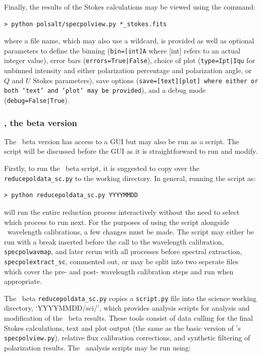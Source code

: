 Finally, the results of the Stokes calculations may be viewed using the command:

\begin{verbatim}> python polsalt/specpolview.py *_stokes.fits\end{verbatim}

\noindent where a file name, which may also use a wildcard, is provided as well as optional para\-meters to define the binning (\texttt{bin=[int]A} where [int] refers to an actual integer value), error bars (\texttt{errors=True|False}), choice of plot (\texttt{type=Ipt|Iqu} for unbinned intensity and either polarization percentage and polarization angle, or $Q$ and $U$ Stokes parameters), save options (\texttt{save=[text][plot] where either or both `text' and `plot' may be provided}), and a debug mode (\texttt{debug=False|True}).


\subsubsection{\polsalt, the beta version}

The \polsalt\ beta version has access to a \gls{GUI} but may also be run as a script. The script will be discussed before the \gls{GUI} as it is straightforward to run and modify.

Firstly, to run the \polsalt\ beta script, it is suggested to copy over the \texttt{reducepol\-data\_sc.py} to the working directory. In general, running the script as:

\begin{verbatim}> python reducepoldata_sc.py YYYYMMDD\end{verbatim}

\noindent will run the entire reduction process interactively without the need to select which process to run next. For the purposes of using the script alongside \iraf\ wavelength calibrations, a few changes must be made. The script may either be run with a break inserted before the call to the wavelength calibration, \texttt{specpolwavmap}, and later rerun with all processes before spectral extraction, \texttt{specpolextract\_sc}, commented out, or may be split into two seperate files which cover the pre- and post- wavelength calibration steps and run when appropriate.

The \polsalt\ beta \texttt{reducepoldata\_sc.py} copies a \texttt{script.py} file into the science working directory, `YYYYMMDD/sci/', which provides analysis scripts for analysis and modification of the \polsalt\ beta results. These tools consist of data culling for the final Stokes calculations, text and plot output (the same as the basic version of \polsalt's \texttt{specpolview.py}), relative flux calibration corrections, and synthetic filtering of polarization results. The \polsalt\ analysis scripts may be run using:

